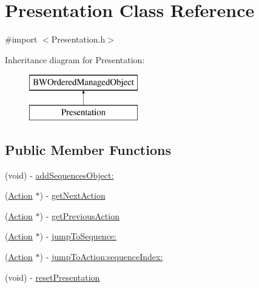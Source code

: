 \hypertarget{interface_presentation}{
\section{Presentation Class Reference}
\label{interface_presentation}
}


{\ttfamily \#import $<$Presentation.h$>$}

Inheritance diagram for Presentation:\begin{figure}[H]
\begin{center}
\leavevmode
\includegraphics[height=2.000000cm]{interface_presentation}
\end{center}
\end{figure}
\subsection*{Public Member Functions}
\begin{DoxyCompactItemize}
\item 
(void) -\/ \hyperlink{interface_presentation_abe0d577eacc5979af6c36f33152bdba1}{addSequencesObject:}
\item 
(\hyperlink{interface_action}{Action} $\ast$) -\/ \hyperlink{interface_presentation_a7610e6190c74d1989b6b31e2c8732f5b}{getNextAction}
\item 
(\hyperlink{interface_action}{Action} $\ast$) -\/ \hyperlink{interface_presentation_a77fde04c365dc21f44f3819468a9d1b0}{getPreviousAction}
\item 
(\hyperlink{interface_action}{Action} $\ast$) -\/ \hyperlink{interface_presentation_a3f79911f677aeaf74121bcb97ce8b6a7}{jumpToSequence:}
\item 
(\hyperlink{interface_action}{Action} $\ast$) -\/ \hyperlink{interface_presentation_a11255d1277217b93316b1c3593ce41c2}{jumpToAction:sequenceIndex:}
\item 
(void) -\/ \hyperlink{interface_presentation_adac763e2e7db30db1d4e20a27f09a999}{resetPresentation}
\end{DoxyCompactItemize}
